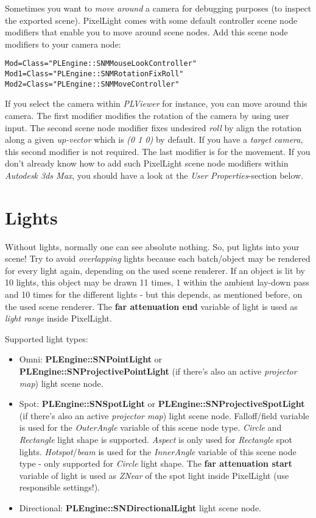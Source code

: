 Sometimes you want to \emph{move around} a camera for debugging purposes (to inspect the exported scene). PixelLight comes with some default controller scene node modifiers that enable you to move around scene nodes. Add this scene node modifiers to your camera node:

\begin{lstlisting}[caption=Free camera scene node modifiers]
Mod=Class="PLEngine::SNMMouseLookController"
Mod1=Class="PLEngine::SNMRotationFixRoll"
Mod2=Class="PLEngine::SNMMoveController"
\end{lstlisting}

If you select the camera within \emph{PLViewer} for instance, you can move around this camera. The first modifier modifies the rotation of the camera by using user input. The second scene node modifier fixes undesired \emph{roll} by align the rotation along a given \emph{up-vector} which is \emph{(0 1 0)} by default. If you have a \emph{target camera}, this second modifier is not required. The last modifier is for the movement. If you don't already know how to add such PixelLight scene node modifiers within \emph{Autodesk 3ds Max}, you should have a look at the \emph{User Properties}-section below.




\section{Lights}
Without lights, normally one can see absolute nothing. So, put lights into your scene! Try to avoid \emph{overlapping} lights because each batch/object may be rendered for every light again, depending on the used scene renderer. If an object is lit by 10 lights, this object may be drawn 11 times, 1 within the ambient lay-down pass and 10 times for the different lights - but this depends, as mentioned before, on the used scene renderer. The \textbf{far attenuation end} variable of light is used as \emph{light range} inside PixelLight.

Supported light types:
\begin{itemize}
\item{Omni: \textbf{PLEngine::SNPointLight} or \textbf{PLEngine::SNProjectivePointLight} (if there's also an active \emph{projector map}) light scene node.}
\item{Spot: \textbf{PLEngine::SNSpotLight} or \textbf{PLEngine::SNProjectiveSpotLight} (if there's also an active \emph{projector map}) light scene node. Falloff/field variable is used for the \emph{OuterAngle} variable of this scene node type. \emph{Circle} and \emph{Rectangle} light shape is supported. \emph{Aspect} is only used for \emph{Rectangle} spot lights. \emph{Hotspot}/\emph{beam} is used for the \emph{InnerAngle} variable of this scene node type - only supported for \emph{Circle} light shape. The \textbf{far attenuation start} variable of light is used as \emph{ZNear} of the spot light inside PixelLight (use responsible settings!).}
\item{Directional: \textbf{PLEngine::SNDirectionalLight} light scene node.}
\end{itemize}

